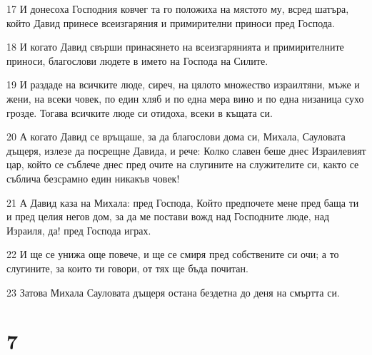 \par 17 И донесоха Господния ковчег та го положиха на мястото му, всред шатъра, който Давид принесе всеизгаряния и примирителни приноси пред Господа.
\par 18 И когато Давид свърши принасянето на всеизгарянията и примирителните приноси, благослови людете в името на Господа на Силите.
\par 19 И раздаде на всичките люде, сиреч, на цялото множество израилтяни, мъже и жени, на всеки човек, по един хляб и по една мера вино и по една низаница сухо грозде. Тогава всичките люде си отидоха, всеки в къщата си.
\par 20 А когато Давид се връщаше, за да благослови дома си, Михала, Сауловата дъщеря, излезе да посрещне Давида, и рече: Колко славен беше днес Израилевият цар, който се съблече днес пред очите на слугините на служителите си, както се съблича безсрамно един никакъв човек!
\par 21 А Давид каза на Михала: пред Господа, Който предпочете мене пред баща ти и пред целия негов дом, за да ме постави вожд над Господните люде, над Израиля, да! пред Господа играх.
\par 22 И ще се унижа още повече, и ще се смиря пред собствените си очи; а то слугините, за които ти говори, от тях ще бъда почитан.
\par 23 Затова Михала Сауловата дъщеря остана бездетна до деня на смъртта си.

\chapter{7}

